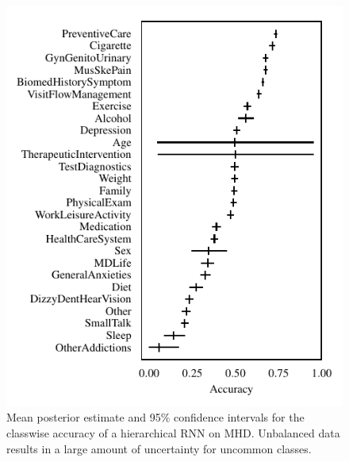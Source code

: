\documentclass{article}
\begin{document}
\begin{figure}[t]
    \centering
    \includegraphics{figures/mhd_accuracy.pdf}
    \caption{
        Mean posterior estimate and 95\% confidence intervals for the classwise accuracy of a hierarchical RNN on MHD.
        Unbalanced data results in a large amount of uncertainty for uncommon classes.
    }
    \label{fig:mhd_acc}
\end{figure}
\end{document}
